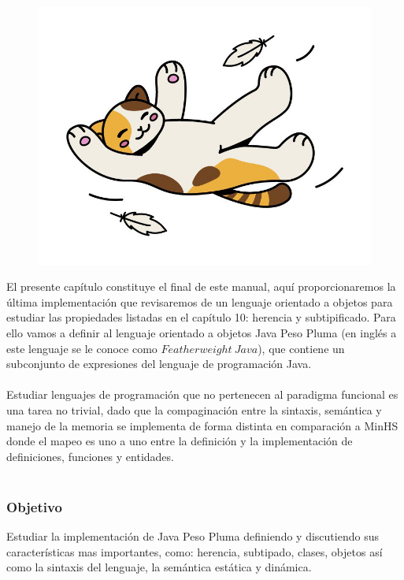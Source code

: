 
\begin{figure}[htbp]
    \centerline{\includegraphics[scale=.4]{assets/11_gatito_cayendo.jpg}}
\end{figure} 
\bigskip

El presente capítulo constituye el final de este manual, aquí proporcionaremos la última implementación que revisaremos de un lenguaje orientado a objetos para estudiar las propiedades listadas en el capítulo 10: herencia y subtipificado.
Para ello vamos a definir al lenguaje orientado a objetos \textsf{Java Peso Pluma} (en inglés a este lenguaje se le conoce como $Featherweight\ Java$), que contiene un subconjunto de expresiones del lenguaje de programación \textsf{Java}.\\\\
Estudiar lenguajes de programación que no pertenecen al paradigma funcional es una tarea no trivial, dado que la compaginación entre la sintaxis, semántica y manejo de la memoria se implementa de forma distinta en comparación a \textsf{MinHS} donde el mapeo es uno a uno entre la definición y la implementación de definiciones, funciones y entidades.\\\\

\subsubsection{Objetivo}
Estudiar la implementación de \textsf{Java Peso Pluma} definiendo y discutiendo sus características mas importantes, como: herencia, subtipado, clases, objetos así como la sintaxis del lenguaje, la semántica estática y dinámica.\\

